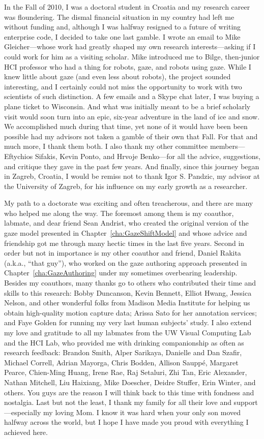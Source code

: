 In the Fall of 2010, I was a doctoral student in Croatia and my research career was floundering. The dismal financial situation in my country had left me without funding and, although I was halfway resigned to a future of writing enterprise code, I decided to take one last gamble. I wrote an email to Mike Gleicher---whose work had greatly shaped my own research interests---asking if I could work for him as a visiting scholar. Mike introduced me to Bilge, then-junior HCI professor who had a thing for robots, gaze, and robots using gaze. While I knew little about gaze (and even less about robots), the project sounded interesting, and I certainly could not miss the opportunity to work with two scientists of such distinction. A few emails and a Skype chat later, I was buying a plane ticket to Wisconsin. And what was initially meant to be a brief scholarly visit would soon turn into an epic, six-year adventure in the land of ice and snow. We accomplished much during that time, yet none of it would have been been possible had my advisors not taken a gamble of their own that Fall. For that and much more, I thank them both. I also thank my other committee members---Eftychios Sifakis, Kevin Ponto, and Hrvoje Benko---for all the advice, suggestions, and critique they gave in the past few years. And finally, since this journey began in Zagreb, Croatia, I would be remiss not to thank Igor S. Pandzic, my advisor at the University of Zagreb, for his influence on my early growth as a researcher.

My path to a doctorate was exciting and often treacherous, and there are many who helped me along the way. The foremost among them is my coauthor, labmate, and dear friend Sean Andrist, who created the original version of the gaze model presented in Chapter~\ref{cha:GazeShiftModel} and whose advice and friendship got me through many hectic times in the last five years. Second in order but not in importance is my other coauthor and friend, Daniel Rakita (a.k.a., ``that guy''), who worked on the gaze authoring approach presented in Chapter~\ref{cha:GazeAuthoring} under my sometimes overbearing leadership. Besides my coauthors, many thanks go to others who contributed their time and skills to this research: Bobby Duncanson, Kevin Bennett, Elliot Hwang, Jessica Nelson, and other wonderful folks from Madison Media Institute for helping us obtain high-quality motion capture data; Arissa Sato for her annotation services; and Faye Golden for running my very last human subjects' study. I also extend my love and gratitude to all my labmates from the UW Visual Computing Lab and the HCI Lab, who provided me with drinking companionship as often as research feedback: Brandon Smith, Alper Sarikaya, Danielle and Dan Szafir, Michael Correll, Adrian Mayorga, Chris Bodden, Allison Saupp\'{e}, Margaret Pearce, Chien-Ming Huang, Irene Rae, Raj Setaluri, Zhi Tan, Eric Alexander, Nathan Mitchell, Liu Haixiang, Mike Doescher, Deidre Stuffer, Erin Winter, and others. You guys are the reason I will think back to this time with fondness and nostalgia. Last but not the least, I thank my family for all their love and support---especially my loving Mom. I know it was hard when your only son moved halfway across the world, but I hope I have made you proud with everything I achieved here. 